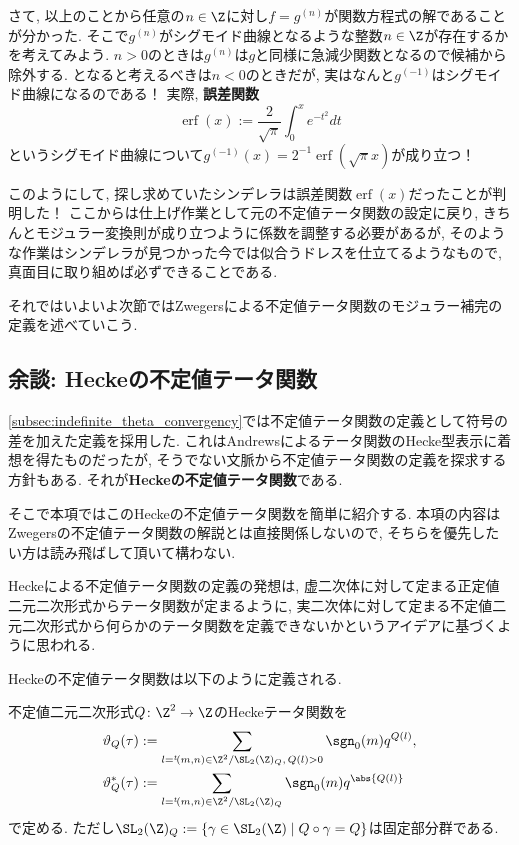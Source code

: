 \documentclass[11pt,b5paper,oneside,lualatex]{ltjsarticle} %
\DeclareMathOperator{\erf}{erf}
\numberwithin{equation}{section} %
\begin{document}
さて, 以上のことから任意の$ n \in \Z $に対し$ f = g^{(n)} $が関数方程式の解であることが分かった. 
そこで$ g^{(n)} $がシグモイド曲線となるような整数$ n \in \Z $が存在するかを考えてみよう. 
$ n>0 $のときは$ g^{(n)} $は$ g $と同様に急減少関数となるので候補から除外する. 
となると考えるべきは$ n < 0 $のときだが, 実はなんと$ g^{(-1)} $はシグモイド曲線になるのである！
実際, \textbf{誤差関数}
\[
\erf(x) := \frac{2}{\sqrt{\pi}} \int_{0}^{x} e^{-t^2} dt
\]
というシグモイド曲線について$ g^{(-1)} (x) = 2^{-1} \erf(\sqrt{\pi} x) $が成り立つ！

このようにして, 探し求めていたシンデレラは誤差関数$ \erf(x) $だったことが判明した！
ここからは仕上げ作業として元の不定値テータ関数の設定に戻り, きちんとモジュラー変換則が成り立つように係数を調整する必要があるが, そのような作業はシンデレラが見つかった今では似合うドレスを仕立てるようなもので, 真面目に取り組めば必ずできることである. 

それではいよいよ次節ではZwegersによる不定値テータ関数のモジュラー補完の定義を述べていこう. 




\subsection{余談: Heckeの不定値テータ関数} \label{subsec:Hecke_theta}


\cref{subsec:indefinite_theta_convergency}では不定値テータ関数の定義として符号の差を加えた定義を採用した. 
これはAndrewsによるテータ関数のHecke型表示に着想を得たものだったが, そうでない文脈から不定値テータ関数の定義を探求する方針もある. 
それが\textbf{Heckeの不定値テータ関数}である. 

そこで本項ではこのHeckeの不定値テータ関数を簡単に紹介する. 
本項の内容はZwegersの不定値テータ関数の解説とは直接関係しないので, そちらを優先したい方は読み飛ばして頂いて構わない. 

Heckeによる不定値テータ関数の定義の発想は, 虚二次体に対して定まる正定値二元二次形式からテータ関数が定まるように, 実二次体に対して定まる不定値二元二次形式から何らかのテータ関数を定義できないかというアイデアに基づくように思われる. 

Heckeの不定値テータ関数は以下のように定義される. 

\begin{dfn}
	不定値二元二次形式$ Q \colon \Z^2 \to \Z $のHeckeテータ関数を
	\begin{align}
		\vartheta_Q (\tau) 
		&:=
		\sum_{l = {}^t\!(m, n) \in \Z^2 / \SL_2(\Z)_Q, \, Q(l) > 0} \sgn_0(m) q^{Q(l)}, 
		\\
		\vartheta_Q^* (\tau)
		&:=
		\sum_{l = {}^t\!(m, n) \in \Z^2 / \SL_2(\Z)_Q} \sgn_0(m) q^{\abs{Q(l)}}
	\end{align}
	で定める. 
	ただし$ \SL_2(\Z)_Q := \{ \gamma \in \SL_2(\Z) \mid Q \circ \gamma = Q \} $は固定部分群である. 
\end{dfn}
\end{document}
